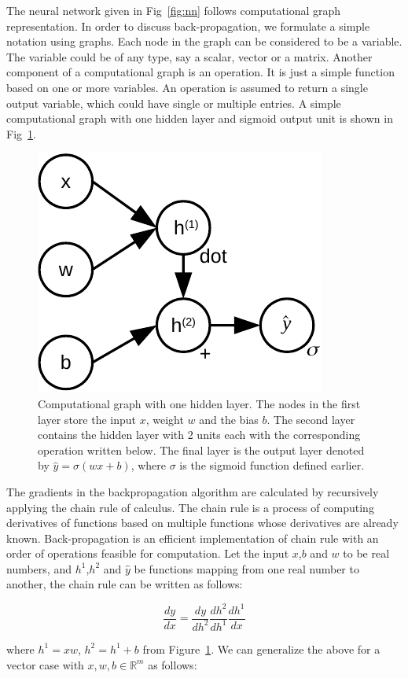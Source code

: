 The neural network given in Fig~\ref{fig:nn} follows computational graph representation. In order to discuss back-propagation, we formulate a simple notation using graphs. Each node in the graph can be considered to be a variable. The variable could be of any type, say a scalar, vector or a matrix. Another component of a computational graph is an operation. It is just a simple function based on one or more variables. An operation is assumed to return a single output variable, which could have single or multiple entries. A simple computational graph with one hidden layer and sigmoid output unit is shown in Fig~\ref{fig:graph}.  

\begin{figure}[!htbp]
	\centering
	\includegraphics[width=0.4\linewidth]{./Figures/back_prop-crop.pdf}
	\caption{Computational graph with one hidden layer. The nodes in the first layer store the input $x$, weight $w$ and the bias $b$. The second layer contains the hidden layer with 2 units each with the corresponding operation written below. The final layer is the output layer denoted by  $\hat{y}=\sigma(wx+b)$, where $\sigma$ is the sigmoid function defined earlier.}
	\label{fig:graph}
\end{figure}

The gradients in the backpropagation algorithm are calculated by recursively applying the chain rule of calculus. The chain rule is a process of computing derivatives of functions based on multiple functions whose derivatives are already known. Back-propagation is an efficient implementation of chain rule with an order of operations feasible for computation. Let the input $x$,$b$ and $w$ to be real numbers, and $h^{1}$,$h^{2}$ and $\hat{y}$ be functions mapping from one real number to another, the chain rule can be written as follows:

\begin{equation}
\frac{d y}{d x}=\frac{d y}{d h^{2}} \frac{d h^{2}}{d h^{1}} \frac{d h^{1}}{d x}
\end{equation}

where $h^{1}=xw$, $h^{2}=h^{1}+b$ from Figure~\ref{fig:graph}. We can generalize the above for a vector case with $x,w,b \in \mathbb{R}^{m}$ as follows:

